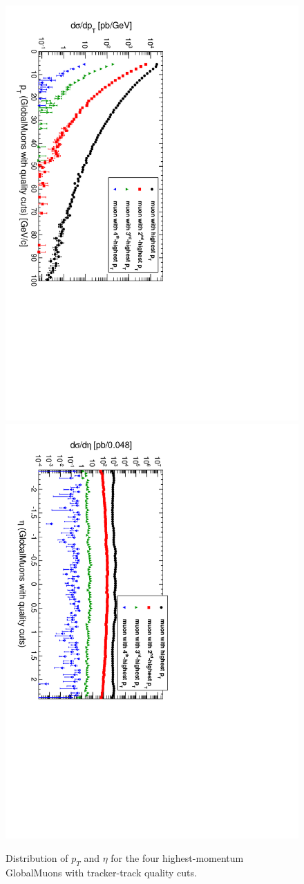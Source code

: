 \documentclass[12pt]{article}
\begin{document}
\begin{figure}
\includegraphics[height=0.5\linewidth, angle=90]{fig/backgroundsMatching_plot/ptcurves_GlobalMuonsGoodTracker.pdf}
\includegraphics[height=0.5\linewidth, angle=90]{fig/backgroundsMatching_plot/etacurves_GlobalMuonsGoodTracker.pdf}

\caption{Distribution of $p_T$ and $\eta$ for the four highest-momentum GlobalMuons with tracker-track quality cuts. \label{fig:curves_GlobalMuonsGoodTracker}}
\end{figure}
\end{document}
